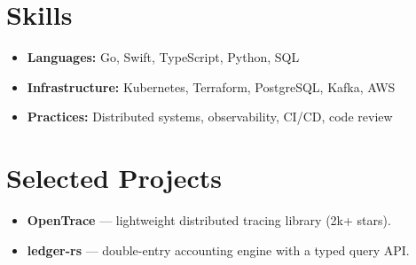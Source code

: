 \documentclass[letterpaper,11pt]{article}
\begin{document}
\section{Skills}
\begin{itemize}
  \item \textbf{Languages:} Go, Swift, TypeScript, Python, SQL
  \item \textbf{Infrastructure:} Kubernetes, Terraform, PostgreSQL, Kafka, AWS
  \item \textbf{Practices:} Distributed systems, observability, CI/CD, code review
\end{itemize}

\section{Selected Projects}
\begin{itemize}
  \item \textbf{OpenTrace} --- lightweight distributed tracing library (2k+ stars).
  \item \textbf{ledger-rs} --- double-entry accounting engine with a typed query API.
\end{itemize}
\end{document}
